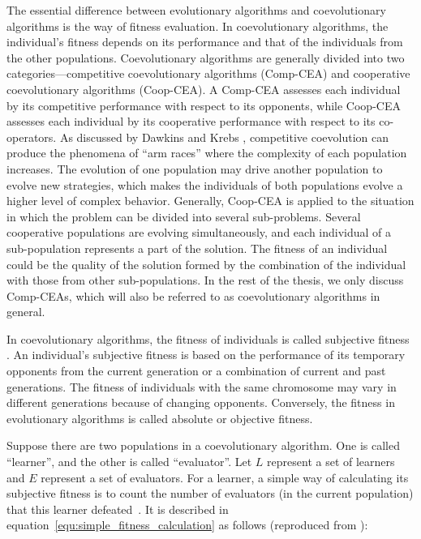 The essential difference between evolutionary algorithms and coevolutionary algorithms is the way of fitness evaluation. In coevolutionary algorithms, the individual's fitness depends on its performance and that of the individuals from the other populations. Coevolutionary algorithms are generally divided into two categories---competitive coevolutionary algorithms  (Comp-CEA) and cooperative coevolutionary algorithms (Coop-CEA). A Comp-CEA assesses each individual by its competitive performance with respect to its opponents, while Coop-CEA assesses each individual by its cooperative performance with respect to its co-operators. As discussed by Dawkins and Krebs \cite{Dawkins_1979}, competitive coevolution can produce the phenomena of ``arm races'' where the complexity of each population increases. The evolution of one population may drive another population to evolve new strategies, which makes the individuals of both populations evolve a higher level of complex behavior. Generally, Coop-CEA is applied to the situation in which the problem can be divided into several sub-problems. Several cooperative populations are evolving simultaneously, and each individual of a sub-population represents a part of the solution. The fitness of an individual could be the quality of the solution formed by the combination of the individual with those from other sub-populations. In the rest of the thesis, we only discuss Comp-CEAs, which will also be referred to as coevolutionary algorithms in general.

In coevolutionary algorithms, the fitness of individuals is called subjective fitness \cite{John_2004}. An individual's subjective fitness is based on the performance of its temporary opponents from the current generation or a combination of current and past generations. The fitness of individuals with the same chromosome may vary in different generations because of changing opponents. Conversely, the fitness in evolutionary algorithms is called absolute or objective fitness.

Suppose there are two populations in a coevolutionary algorithm. One is called ``learner'', and the other is called ``evaluator''. Let $L$ represent a set of learners and $E$ represent a set of evaluators. For a learner, a simple way of calculating its subjective fitness is to count the number of evaluators (in the current population) that this learner defeated~\cite{Angeline_1993}. It is described in equation~\eqref{equ:simple_fitness_calculation} as follows (reproduced from \cite{BiLi2009}):

